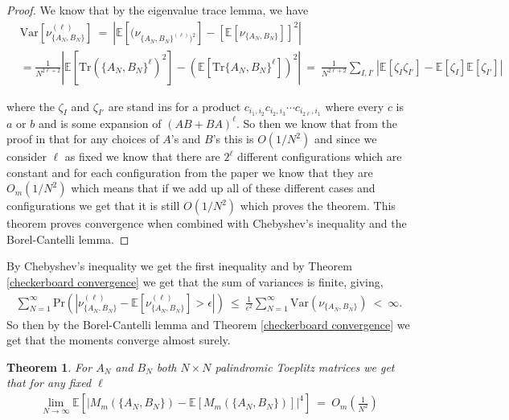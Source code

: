 \documentclass[11pt,reqno]{amsart}
\numberwithin{equation}{section}
\theoremstyle{plain}
\newtheorem{theorem}[thm]{Theorem}
\newcommand{\E}[1]{\mathbb{E}[#1]}
\begin{document}
\begin{proof}
We know that by the eigenvalue trace lemma, we have
\begin{align}
&\text{Var}\left[\nu_{\{A_N,B_N\}}^{(\ell)}\right]\ = \ \left| \E{(\nu_{\{A_N,B_N\}^{(\ell)})^2}}-\left[\E{\nu_{\{A_N,B_N\}}}\right]^2\right|\nonumber \\&=\frac{1}{N^{2\ell +2}}\left|\E{\text{Tr}(\{A_N,B_N\}^\ell)^2}-(\E{\text{Tr}\{A_N,B_N\}^{\ell}})^2\right|
\ = \ \frac{1}{N^{2\ell+2}}\sum_{I,I'}\left|\E{\zeta_{I}\zeta_{I'}}-\E{\zeta_I}\E{\zeta_{I'}}\right|
\end{align}

where the $\zeta_I$ and $\zeta_{I'}$ are stand ins for a product $c_{i_1,i_2}c_{i_2,i_3}\cdots c_{i_{2\ell},i_1}$ where every $c$ is $a$ or $b$ and is some expansion of $(AB+BA)^\ell$. So then we know that from the proof in \cite{split} that for any choices of $A$'s and $B$'s this is $O(1/N^2)$ and since we consider $\ell$ as fixed we know that there are $2^\ell$ different configurations which are constant and for each configuration from the paper we know that they are $O_m(1/N^2)$ which means that if we add up all of these different cases and configurations we get that it is still $O(1/N^2)$ which proves the theorem. This theorem proves convergence when combined with Chebyshev's inequality and the Borel-Cantelli lemma.
\end{proof}

By Chebyshev's inequality we get the first inequality and by Theorem \ref{checkerboard convergence} we get that the sum of variances is finite, giving,
\begin{align}
\sum_{N=1}^\infty \text{Pr}\left(\left|\nu_{\{A_N,B_N\}}^{(\ell)}-\E{\nu_{\{A_N,B_N\}}^{(\ell)}}>\epsilon\right|\right)\ \leq \ \frac{1}{\epsilon^2}\sum_{N=1}^\infty \text{Var}(\nu_{\{A_N,B_N\}})\ < \ \infty.
\end{align}
So then by the Borel-Cantelli lemma and Theorem \ref{checkerboard convergence} we get that the moments converge almost surely.

\begin{theorem}\label{PT-PT Convergence} For $A_N$ and $B_N$ both $N\times N$ palindromic Toeplitz matrices we get that for any fixed $\ell$
\begin{align}
\lim_{N\to\infty}\E{|M_m(\{A_N,B_N\})-\E{M_m(\{A_N,B_N\})}|^4}\ = \ O_m\left(\frac{1}{N^2}\right)
\end{align}
\end{theorem}
\end{document}
